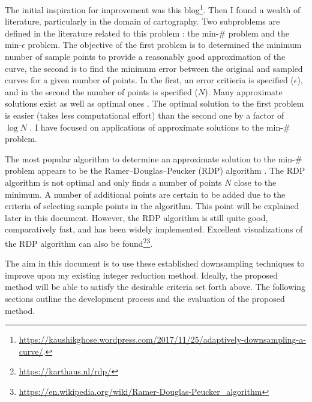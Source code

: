 \documentclass[a4paper,11pt]{article}
\begin{document}
The initial inspiration for improvement was this blog\footnote{\label{fn:blog}\url{https://kaushikghose.wordpress.com/2017/11/25/adaptively-downsampling-a-curve/}. \hfill}.
Then I found a wealth of literature, particularly in the domain of cartography.
Two subproblems are defined in the literature related to this problem \citep{ImaiPolygonalApproximationsCurve1988}: the min-\# problem and the min-$\epsilon$ problem.
The objective of the first problem is to determined the minimum number of sample points to provide a reasonably good approximation of the curve, the second is to find the minimum error between the original and sampled curves for a given number of points.
In the first, an error critieria is specified ($\epsilon$), and in the second the number of points is specified ($N$).
Many approximate solutions exist \citep{Rameriterativeprocedurepolygonal1972,DouglasAlgorithmsreductionnumber1973,HeckbertSurveyPolygonalSurface1997} as well as optimal ones \citep{ImaiPolygonalApproximationsCurve1988,PerezOptimumpolygonalapproximation1994,ChanApproximationPolygonalCurves1996}.
The optimal solution to the first problem is easier (takes less computational effort) than the second one by a factor of $\log N$ \citep{ChanApproximationPolygonalCurves1996}.
I have focused on applications of approximate solutions to the min-\# problem.

The most popular algorithm to determine an approximate solution to the min-\# problem appears to be the Ramer–Douglas–Peucker (RDP) algorithm \citep{Rameriterativeprocedurepolygonal1972,DouglasAlgorithmsreductionnumber1973,HeckbertSurveyPolygonalSurface1997}.
The RDP algorithm is not optimal and only finds a number of points $N$ close to the minimum.
A number of additional points are certain to be added due to the criteria of selecting sample points in the algorithm.
This point will be explained later in this document.
However, the RDP algorithm is still quite good, comparatively fast, and has been widely implemented.
Excellent visualizations of the RDP algorithm can also be found\footnote{\url{https://karthaus.nl/rdp/}}\footnote{\url{https://en.wikipedia.org/wiki/Ramer-Douglas-Peucker_algorithm}}.

The aim in this document is to use these established downsampling techniques to improve upon my existing integer reduction method.
Ideally, the proposed method will be able to satisfy the desirable criteria set forth above.
The following sections outline the development process and the evaluation of the proposed method.
\end{document}
